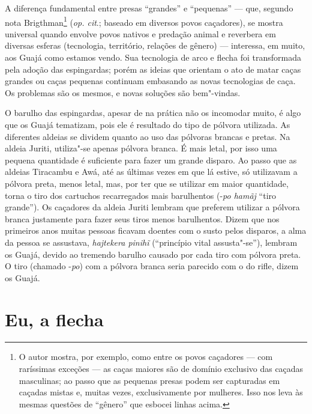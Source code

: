 A diferença fundamental entre presas ``grandes'' e ``pequenas'' --- que,
segundo nota Brigthman\footnote{O autor mostra, por exemplo, como entre
  os povos caçadores --- com raríssimas exceções --- as caças maiores são de
  domínio exclusivo das caçadas masculinas; ao passo que as pequenas
  presas podem ser capturadas em caçadas mistas e, muitas vezes,
  exclusivamente por mulheres. Isso nos leva às mesmas questões de
  ``gênero'' que esbocei linhas acima.} (\emph{op. cit}.; baseado em diversos
povos caçadores), se mostra universal quando envolve povos nativos e
predação animal e reverbera em diversas esferas (tecnologia, território,
relações de gênero) --- interessa, em muito, aos Guajá como estamos vendo.
Sua tecnologia de arco e flecha foi transformada pela adoção das
espingardas; porém as ideias que orientam o ato de matar caças grandes
ou caças pequenas continuam embasando as novas tecnologias de caça. Os
problemas são os mesmos, e novas soluções são bem"-vindas.

O barulho das espingardas, apesar de na prática não os incomodar muito,
é algo que os Guajá tematizam, pois ele é resultado do tipo de pólvora
utilizada. As diferentes aldeias se dividem quanto ao uso das pólvoras
brancas e pretas. Na aldeia Juriti, utiliza"-se apenas pólvora branca. É
mais letal, por isso uma pequena quantidade é suficiente para fazer um
grande disparo. Ao passo que as aldeias Tiracambu e Awá, até as
últimas vezes em que lá estive, só utilizavam a pólvora preta, menos
letal, mas, por ter que se utilizar em maior quantidade, torna o tiro
dos cartuchos recarregados mais barulhentos (-\emph{po hamãj} ``tiro
grande''). Os caçadores da aldeia Juriti lembram que preferem utilizar a
pólvora branca justamente para fazer seus tiros menos barulhentos. Dizem
que nos primeiros anos muitas pessoas ficavam doentes com o susto pelos
disparos, a alma da pessoa se assustava, \emph{hajtekera pinihĩ}
(``princípio vital assusta"-se''), lembram os Guajá, devido ao tremendo
barulho causado por cada tiro com pólvora preta. O tiro (chamado
-\emph{po}) com a pólvora branca seria parecido com o do rifle, dizem os
Guajá.

\section{Eu, a flecha}\label{eu-a-flecha}

